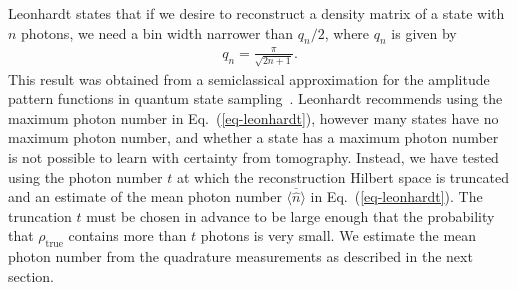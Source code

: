 \documentclass[
reprint,
superscriptaddress,
showpacs,
amsmath,
amssymb,
aps,
pra,
longbibliography
]{revtex4-1}
\newcommand{\rhotrue}{\rho_{\text{true}}}
\begin{document}
Leonhardt states that if we desire to reconstruct a density matrix of
a state with $n$ photons, we need a bin width narrower than $q_n/2$,
where $q_n$ is given by
\begin{eqnarray}
  q_n = \frac{\pi}{\sqrt{2 n + 1}}.
  \label{eq-leonhardt}
\end{eqnarray}
This result was obtained from a semiclassical
approximation for the amplitude pattern functions in quantum state
sampling~\cite{Leonhardt1996}. Leonhardt recommends using the maximum
photon number in Eq.~(\ref{eq-leonhardt}), however many states have no
maximum photon number, and whether a state has a maximum
photon number is not possible to learn with certainty from tomography.
Instead, we have tested using the photon number $t$ at which the
reconstruction Hilbert space is truncated and an estimate of
the mean photon number $\overline{\langle \hat{n} \rangle}$ in
Eq.~(\ref{eq-leonhardt}).  The truncation $t$ must be chosen in
advance to be large enough that the probability that $\rhotrue$
contains more than $t$ photons is very small.  We estimate the mean 
photon number from the quadrature measurements as described in the next section.
\end{document}
